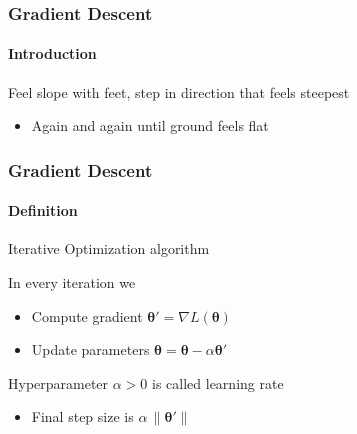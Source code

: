 \documentclass[xetex,professionalfont]{beamer}
\renewcommand\emph[1]{\textcolor{tuwcvl_cvl_blue}{#1}}
\newcommand{\bth}{\boldsymbol{\theta}}
\begin{document}
\begin{frame}
  \frametitle{Gradient Descent}
  \framesubtitle{Introduction}

Feel slope with feet, step in direction that feels steepest
\begin{itemize}
    \item Again and again until ground feels flat
\end{itemize}

\medskip

\begin{center}
\end{center}

\end{frame}


\begin{frame}
  \frametitle{Gradient Descent}
  \framesubtitle{Definition}

\emph{Iterative Optimization} algorithm

\bigskip

In every iteration we
\begin{itemize}
    \item Compute gradient $\bth'=\nabla L(\bth)$
    \item Update parameters $\bth = \bth - \alpha\bth'$
\end{itemize}

\bigskip

Hyperparameter $\alpha>0$ is called \emph{learning rate}
\begin{itemize}
    \item Final \emph{step size} is $\alpha\,\lVert\bth'\rVert$ %
\end{itemize}

\end{frame}
\end{document}
